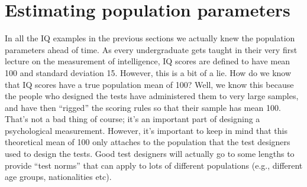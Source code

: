 \documentclass[
  a4paper,
]{book}
\begin{document}
\hypertarget{estimating-population-parameters}{%
\section{Estimating population
parameters}\label{estimating-population-parameters}}

In all the IQ examples in the previous sections we actually knew the
population parameters ahead of time. As every undergraduate gets taught
in their very first lecture on the measurement of intelligence, IQ
scores are defined to have mean 100 and standard deviation 15. However,
this is a bit of a lie. How do we know that IQ scores have a true
population mean of 100? Well, we know this because the people who
designed the tests have administered them to very large samples, and
have then ``rigged'' the scoring rules so that their sample has mean
100. That's not a bad thing of course; it's an important part of
designing a psychological measurement. However, it's important to keep
in mind that this theoretical mean of 100 only attaches to the
population that the test designers used to design the tests. Good test
designers will actually go to some lengths to provide ``test norms''
that can apply to lots of different populations (e.g., different age
groups, nationalities etc).
\end{document}
